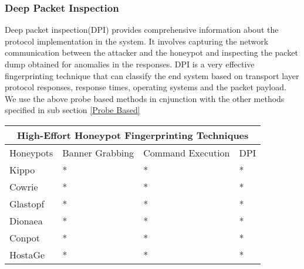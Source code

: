 \documentclass[../main.tex]{subfiles}
\begin{document}
\subsubsection{Deep Packet Inspection}
Deep packet inspection(DPI) provides comprehensive information about the protocol implementation in the system. It involves capturing the network communication between the attacker and the honeypot and inspecting the packet dump obtained for anomalies in the responses. DPI is a very effective fingerprinting technique that can classify the end system based on transport layer protocol responses, response times, operating systems and the packet payload. We use the above probe based methods in cnjunction with the other methods specified in sub section \ref{Probe Based} 





\begin{tabular}{ |p{1.5cm}||p{1.5cm}|p{1.5cm}|p{1cm}| }
 \hline
 \multicolumn{4}{|c|}{High-Effort Honeypot Fingerprinting Techniques} \\
 \hline
 Honeypots & Banner Grabbing & Command Execution & DPI \\
 \hline
 Kippo   & *  &* & * \\
 Cowrie  & *  &* & * \\
 Glastopf& *  &* & *  \\
 Dionaea & *  &* & * \\
 Conpot  & *  &* & * \\
 HostaGe & *  &* & * \\
 \hline
\end{tabular}
\end{document}
